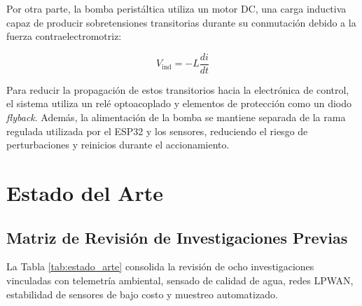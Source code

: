 \documentclass[11pt,a4paper]{article}
\begin{document}
Por otra parte, la bomba peristáltica utiliza un motor DC, una carga inductiva capaz de producir sobretensiones transitorias durante su conmutación debido a la fuerza contraelectromotriz:

\begin{equation}
    V_{\text{ind}} = -L\frac{di}{dt}
\end{equation}

Para reducir la propagación de estos transitorios hacia la electrónica de control, el sistema utiliza un relé optoacoplado y elementos de protección como un diodo \textit{flyback}. Además, la alimentación de la bomba se mantiene separada de la rama regulada utilizada por el ESP32 y los sensores, reduciendo el riesgo de perturbaciones y reinicios durante el accionamiento.

\section{Estado del Arte}

\subsection{Matriz de Revisión de Investigaciones Previas}

La Tabla \ref{tab:estado_arte} consolida la revisión de ocho investigaciones vinculadas con telemetría ambiental, sensado de calidad de agua, redes LPWAN, estabilidad de sensores de bajo costo y muestreo automatizado.
\end{document}
